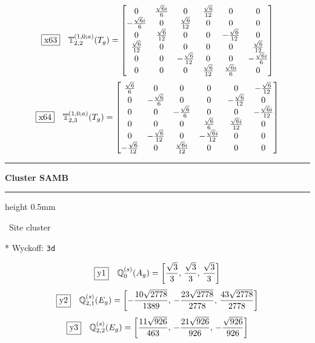 \documentclass[fleqn,10pt,landscape]{jsarticle}
\begin{document}
\begin{dmath*}
\fbox{x63}\quad \mathbb{T}_{2,2}^{(1,0;a)}(T_{g})=\begin{bmatrix} 0 & \frac{\sqrt{6} i}{6} & 0 & \frac{\sqrt{6}}{12} & 0 & 0 \\ - \frac{\sqrt{6} i}{6} & 0 & \frac{\sqrt{6}}{12} & 0 & 0 & 0 \\ 0 & \frac{\sqrt{6}}{12} & 0 & 0 & - \frac{\sqrt{6}}{12} & 0 \\ \frac{\sqrt{6}}{12} & 0 & 0 & 0 & 0 & \frac{\sqrt{6}}{12} \\ 0 & 0 & - \frac{\sqrt{6}}{12} & 0 & 0 & - \frac{\sqrt{6} i}{6} \\ 0 & 0 & 0 & \frac{\sqrt{6}}{12} & \frac{\sqrt{6} i}{6} & 0 \end{bmatrix}
\end{dmath*}
\begin{dmath*}
\fbox{x64}\quad \mathbb{T}_{2,3}^{(1,0;a)}(T_{g})=\begin{bmatrix} \frac{\sqrt{6}}{6} & 0 & 0 & 0 & 0 & - \frac{\sqrt{6}}{12} \\ 0 & - \frac{\sqrt{6}}{6} & 0 & 0 & - \frac{\sqrt{6}}{12} & 0 \\ 0 & 0 & - \frac{\sqrt{6}}{6} & 0 & 0 & - \frac{\sqrt{6} i}{12} \\ 0 & 0 & 0 & \frac{\sqrt{6}}{6} & \frac{\sqrt{6} i}{12} & 0 \\ 0 & - \frac{\sqrt{6}}{12} & 0 & - \frac{\sqrt{6} i}{12} & 0 & 0 \\ - \frac{\sqrt{6}}{12} & 0 & \frac{\sqrt{6} i}{12} & 0 & 0 & 0 \end{bmatrix}
\end{dmath*}
\vspace{5mm}
\noindent \rule[0.5mm]{5mm}{0.5mm}\hspace{3mm}\textbf{Cluster SAMB}\hspace{3mm}\leaders\hrule height 0.5mm\hfill\kern0pt
\vspace{3mm}

\noindent\textbullet\, Site cluster

\vspace{5mm}

\noindent ** Wyckoff: \texttt{3d}

\begin{dmath*}
\fbox{y1}\quad \mathbb{Q}_{0}^{(s)}(A_{g})=\left[ \frac{\sqrt{3}}{3},\, \frac{\sqrt{3}}{3},\, \frac{\sqrt{3}}{3} \right]
\end{dmath*}
\begin{dmath*}
\fbox{y2}\quad \mathbb{Q}_{2,1}^{(s)}(E_{g})=\left[ - \frac{10 \sqrt{2778}}{1389},\, - \frac{23 \sqrt{2778}}{2778},\, \frac{43 \sqrt{2778}}{2778} \right]
\end{dmath*}
\begin{dmath*}
\fbox{y3}\quad \mathbb{Q}_{2,2}^{(s)}(E_{g})=\left[ \frac{11 \sqrt{926}}{463},\, - \frac{21 \sqrt{926}}{926},\, - \frac{\sqrt{926}}{926} \right]
\end{dmath*}
\vspace{5mm}
\end{document}
